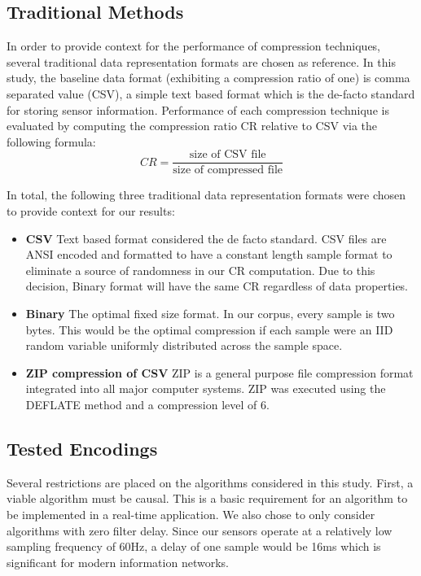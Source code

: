 \documentclass[journal]{IEEEtran}
\begin{document}
\subsection{Traditional Methods}
In order to provide context for the performance of compression techniques, several traditional data representation formats are chosen as reference. In this study, the baseline data format (exhibiting a compression ratio of one) is comma separated value (CSV), a simple text based format which is the de-facto standard for storing sensor information. Performance of each compression technique is evaluated by computing the compression ratio CR relative to CSV via the following formula:
$$CR = \frac{\textrm{size of CSV file}}{\textrm{size of compressed file}}$$

In total, the following three traditional data representation formats were chosen to provide context for our results:

\begin{itemize}
  \item \textbf{CSV} Text based format considered the de facto standard. CSV files are ANSI encoded and formatted to have a constant length sample format to eliminate a source of randomness in our CR computation. Due to this decision, Binary format will have the same CR regardless of data properties. 
  \item \textbf{Binary} The optimal fixed size format. In our corpus, every sample is two bytes. This would be the optimal compression if each sample were an IID random variable uniformly distributed across the sample space.
  \item \textbf{ZIP compression of CSV} ZIP is a general purpose file compression format integrated into all major computer systems. ZIP was executed using the DEFLATE method \cite{Deutsch1996} and a compression level of 6.
\end{itemize}
\subsection{Tested Encodings}


Several restrictions are placed on the algorithms considered in this study. First, a viable algorithm must be causal. This is a basic requirement for an algorithm to be implemented in a real-time application. We also chose to only consider algorithms with zero filter delay. Since our sensors operate at a relatively low sampling frequency of 60Hz, a delay of one sample would be 16ms which is significant for modern information networks.
\end{document}
